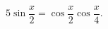 \begin{ex}[type=equation]
	\begin{condition}
		$\ 5\sin {\dfrac{x}{2}} = \cos {\dfrac{x}{2}}\cos{\dfrac{x}{4}}. $
	\end{condition}
\end{ex}